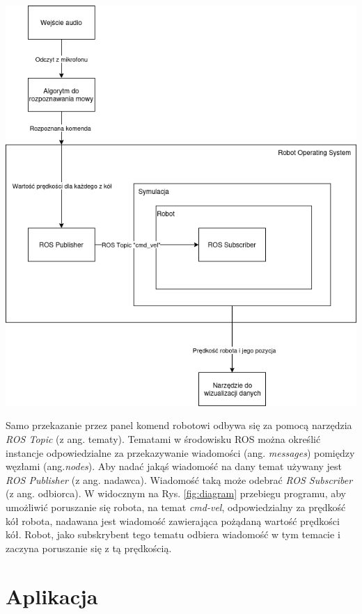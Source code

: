 \begin{center}
    \includegraphics[width=0.95\linewidth]{files/diagram.png}
    \label{fig:diagram}
\end{center}

Samo przekazanie przez panel komend robotowi odbywa się za pomocą narzędzia \textit{ROS Topic} (z ang. tematy). Tematami w środowisku ROS można określić instancje odpowiedzialne za przekazywanie wiadomości (ang. \textit{messages}) pomiędzy węzłami (ang.\textit{nodes}). Aby nadać jakąś wiadomość na dany temat używany jest \textit{ROS Publisher} (z ang. nadawca). Wiadomość taką może odebrać \textit{ROS Subscriber} (z ang. odbiorca). W widocznym na Rys. \ref{fig:diagram} przebiegu programu, aby umożliwić poruszanie się robota, na temat \textit{cmd-vel}, odpowiedzialny za prędkość kół robota, nadawana jest wiadomość zawierająca pożądaną wartość prędkości kół. Robot, jako subskrybent tego tematu odbiera wiadomość w tym temacie i zaczyna poruszanie się z tą prędkością. 


\section{Aplikacja}
\label{sec:App}

